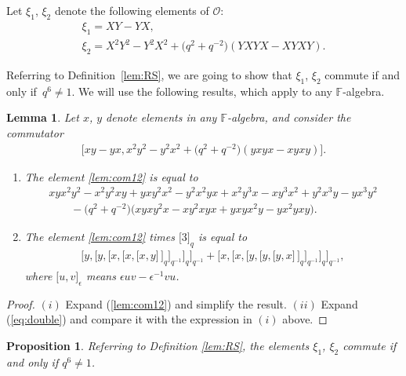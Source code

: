 \documentclass[10pt,a4paper]{amsart}
\numberwithin{equation}{section}
\newtheorem{Lemma}[Theorem]{Lemma}
\newtheorem{Proposition}[Theorem]{Proposition}
{\theoremstyle{definition}
\newtheorem{Note}[Theorem]{Note}
\newtheorem{Definition}[Theorem]{Definition}
\newtheorem{Problem}[Theorem]{Problem}
}
\begin{document}
\begin{Definition}
\label{lem:RS}
Let $\xi_1$, $\xi_2$ denote the following elements of
$\mathcal O$:
\begin{gather*}
\xi_1 =  XY-YX,
\\
 \xi_2 =
X^2Y^2-Y^2X^2+\big(q^2+q^{-2}\big)(YXYX-XYXY).
\end{gather*}
\end{Definition}

Referring to Def\/inition~\ref{lem:RS},
we are going to show that
$\xi_1$, $\xi_2$
commute if and only if~$q^6 \not=1$.
We will use the following results, which
apply to any $\mathbb F$-algebra.

\begin{Lemma}
\label{lem:gen}
Let $x$, $y$ denote elements in any $\mathbb F$-algebra,
and consider the commutator
\begin{gather}
\big\lbrack
xy-yx, x^2y^2-y^2x^2 +\big(q^2+q^{-2}\big)(yxyx-xyxy)
\big\rbrack.
\label{lem:com12}
\end{gather}
\begin{enumerate}\itemsep=0pt
\item[$(i)$] The element
\eqref{lem:com12} is equal to
\begin{gather*}
 xyx^2y^2-x^2y^2xy+yxy^2x^2-y^2x^2yx
+
x^2y^3x-xy^3x^2+y^2x^3y-yx^3y^2
\\
 \qquad {} -
\big(q^2+q^{-2}\big)\big(
xyxy^2x
-xy^2xyx
+yxyx^2y
-yx^2yxy
\big).
\end{gather*}
\item[$(ii)$] The element
\eqref{lem:com12} times
$\lbrack 3\rbrack_q$ is equal to
\begin{gather}
\lbrack y,
\lbrack y,
\lbrack x,
\lbrack x,
\lbrack x,
y
\rbrack \,
\rbrack_q
\rbrack_{q^{-1}}
\rbrack_q
\rbrack_{q^{-1}}
+
\lbrack x,
\lbrack x,
\lbrack y,
\lbrack y,
\lbrack y,
x
\rbrack \,
\rbrack_q
\rbrack_{q^{-1}}
\rbrack_q
\rbrack_{q^{-1}},
\label{eq:double}
\end{gather}
where $\lbrack u,v\rbrack_\epsilon $ means $\epsilon uv-
\epsilon^{-1}vu$.
\end{enumerate}
\end{Lemma}

\begin{proof}
$(i)$ Expand
(\ref{lem:com12}) and simplify the result.
$(ii)$
Expand
(\ref{eq:double})
and compare it with the expression in $(i)$ above.
\end{proof}

\begin{Proposition}
\label{lem:RS2}
Referring to
Definition {\rm \ref{lem:RS}},
the elements $\xi_1$, $\xi_2$ commute
if and only if
$q^6 \not=1$.
\end{Proposition}
\end{document}
